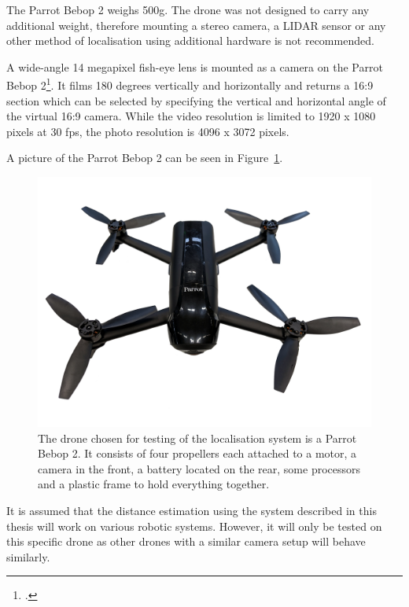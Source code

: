 The Parrot Bebop 2 weighs 500g. The drone was not designed to carry any additional weight, therefore mounting a stereo camera, a LIDAR sensor or any other method of localisation using additional hardware is not recommended.

A wide-angle 14 megapixel fish-eye lens is mounted as a camera on the Parrot Bebop 2\footcite{parrotBebop2}. It films 180 degrees vertically and horizontally and returns a 16:9 section which can be selected by specifying the vertical and horizontal angle of the virtual 16:9 camera. While the video resolution is limited to 1920 x 1080 pixels at 30 fps, the photo resolution is 4096 x 3072 pixels.

A picture of the Parrot Bebop 2 can be seen in Figure~\ref{pic:introduction_equipment_parrotBebop2}.

\begin{figure}[h]
	\centering
	\includegraphics[width=5.5in]{img/introduction_equipment_parrotBebop2.jpg}
	\caption{The drone chosen for testing of the localisation system is a Parrot Bebop 2. It consists of four propellers each attached to a motor, a camera in the front, a battery located on the rear, some processors and a plastic frame to hold everything together.}
	\label{pic:introduction_equipment_parrotBebop2}
\end{figure}

\newpage

It is assumed that the distance estimation using the system described in this thesis will work on various robotic systems. However, it will only be tested on this specific drone as other drones with a similar camera setup will behave similarly.

\filbreak
